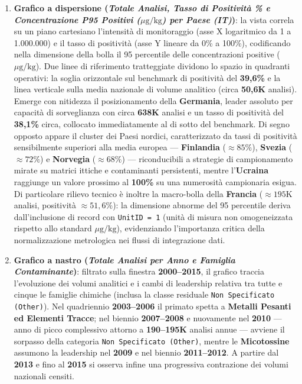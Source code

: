 \begin{enumerate}
    \item \textbf{Grafico a dispersione (\textit{Totale Analisi, Tasso di Positività \% e Concentrazione P95 Positivi ($\mu\text{g/kg}$) per Paese (IT)})}: la vista correla su un piano cartesiano l'intensità di monitoraggio (asse X logaritmico da 1 a 1.000.000) e il tasso di positività (asse Y lineare da 0\% a 100\%), codificando nella dimensione della bolla il 95\textdegree{} percentile delle concentrazioni positive ($\mu\text{g/kg}$). Due linee di riferimento tratteggiate dividono lo spazio in quadranti operativi: la soglia orizzontale sul benchmark di positività del \textbf{39,6\%} e la linea verticale sulla media nazionale di volume analitico (circa \textbf{50,6K} analisi). Emerge con nitidezza il posizionamento della \textbf{Germania}, leader assoluto per capacità di sorveglianza con circa \textbf{638K} analisi e un tasso di positività del \textbf{38,1\%} circa, collocato immediatamente al di sotto del benchmark. Di segno opposto appare il cluster dei Paesi nordici, caratterizzato da tassi di positività sensibilmente superiori alla media europea --- \textbf{Finlandia} ($\approx 85\%$), \textbf{Svezia} ($\approx 72\%$) e \textbf{Norvegia} ($\approx 68\%$) --- riconducibili a strategie di campionamento mirate su matrici ittiche e contaminanti persistenti, mentre l'\textbf{Ucraina} raggiunge un valore prossimo al \textbf{100\%} su una numerosità campionaria esigua. Di particolare rilievo tecnico è inoltre la macro-bolla della \textbf{Francia} ($\approx 195\text{K}$ analisi, positività $\approx 51,6\%$): la dimensione abnorme del 95\textdegree{} percentile deriva dall'inclusione di record con \texttt{UnitID = 1} (unità di misura non omogeneizzata rispetto allo standard $\mu\text{g/kg}$), evidenziando l'importanza critica della normalizzazione metrologica nei flussi di integrazione dati.

    \item \textbf{Grafico a nastro (\textit{Totale Analisi per Anno e Famiglia Contaminante})}: filtrato sulla finestra \textbf{2000--2015}, il grafico traccia l'evoluzione dei volumi analitici e i cambi di leadership relativa tra tutte e cinque le famiglie chimiche (inclusa la classe residuale \texttt{Non Specificato (Other)}). Nel quadriennio \textbf{2003--2006} il primato spetta a \textbf{Metalli Pesanti ed Elementi Tracce}; nel biennio \textbf{2007--2008} e nuovamente nel \textbf{2010} --- anno di picco complessivo attorno a \textbf{190--195K} analisi annue --- avviene il sorpasso della categoria \texttt{Non Specificato (Other)}, mentre le \textbf{Micotossine} assumono la leadership nel \textbf{2009} e nel biennio \textbf{2011--2012}. A partire dal \textbf{2013} e fino al \textbf{2015} si osserva infine una progressiva contrazione dei volumi nazionali censiti.


\end{enumerate}

